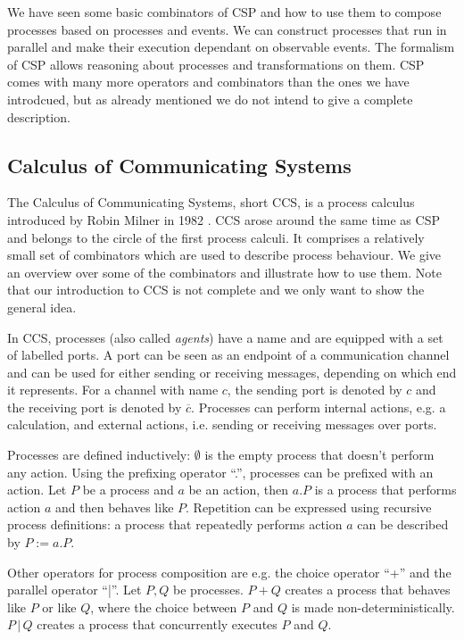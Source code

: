 We have seen some basic combinators of \textsc{CSP} and how to use them to compose processes based on processes and events. We can construct processes that run in parallel and make their execution dependant on observable events. The formalism of \textsc{CSP} allows reasoning about processes and transformations on them. \textsc{CSP} comes with many more operators and combinators than the ones we have introdcued, but as already mentioned we do not intend to give a complete description.


\subsection{Calculus of Communicating Systems}
The Calculus of Communicating Systems, short \textsc{CCS}, is a process calculus introduced by Robin Milner in 1982 \cite{Milner:1982:CCS:539036}. \textsc{CCS} arose around the same time as \textsc{CSP} and belongs to the circle of the first process calculi. It comprises a relatively small set of combinators which are used to describe process behaviour. We give an overview over some of the combinators and illustrate how to use them. Note that our introduction to \textsc{CCS} is not complete and we only want to show the general idea.

In \textsc{CCS}, processes (also called \textit{agents}) have a name and are equipped with a set of labelled ports. A port can be seen as an endpoint of a communication channel and can be used for either sending or receiving messages, depending on which end it represents. For a channel with name $c$, the sending port is denoted by $c$ and the receiving port is denoted by $\overline{c}$. Processes can perform internal actions, e.g. a calculation, and external actions, i.e. sending or receiving messages over ports. 

Processes are defined inductively: $\emptyset$ is the empty process that doesn't perform any action. Using the prefixing operator \enquote{.}, processes can be prefixed with an action. Let $P$ be a process and $a$ be an action, then $a.P$ is a process that performs action $a$ and then behaves like $P$. Repetition can be expressed using recursive process definitions: a process that repeatedly performs action $a$ can be described by $P := a.P$.

Other operators for process composition are e.g. the choice operator \enquote{+} and the parallel operator \enquote{|}. Let $P, Q$ be processes. $P + Q$ creates a process that behaves like $P$ or like $Q$, where the choice between $P$ and $Q$ is made non-deterministically. $P \,|\, Q$ creates a process that concurrently executes $P$ and $Q$.

